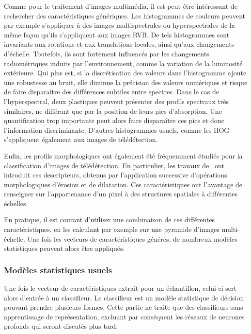 Comme pour le traitement d'images multimédia, il est peut être intéressant de rechercher des caractéristiques génériques. Les histogrammes de couleurs peuvent par exemple s'appliquer à des images multispectrales ou hyperspectrales de la même façon qu'ils s'appliquent aux images \gls{RVB}. De tels histogrammes sont invariants aux rotations et aux translations locales, ainsi qu'aux changements d'échelle. Toutefois, ils sont fortement influencés par les changements radiométriques induits par l'environnement, comme la variation de la luminosité extérieure. Qui plus est, si la discrétisation des valeurs dans l'histogramme ajoute une robustesse au bruit, elle diminue la précision des valeurs numériques et risque de faire disparaître des différences subtiles entre spectres. Dans le cas de l'hyperspectral, deux plastiques peuvent présenter des profils spectraux très similaires, ne différant que par la position de leurs pics d'absorption. Une quantification trop importante peut alors faire disparaître ces pics et donc l'information discriminante. D'autres histogrammes usuels, comme les \gls{HOG}~\cite{dalal_histograms_2005} s'appliquent également aux images de télédétection.

Enfin, les profils morphologiques ont également été fréquemment étudiés pour la classification d'images de télédétection. En particulier, les travaux de~\citet{benediktsson_classification_2003} ont introduit ces descripteurs, obtenus par l'application successive d'opérations morphologiques d'érosion et de dilatation. Ces caractéristiques ont l'avantage de renseigner sur l'appartenance d'un pixel à des structures spatiales à différentes échelles.

En pratique, il est courant d'utiliser une combinaison de ces différentes caractéristiques, en les calculant par exemple sur une pyramide d'images multi-échelle. Une fois les vecteurs de caractéristiques générés, de nombreux modèles statistiques peuvent alors être appliqués.

\subsubsection{Modèles statistiques usuels}

Une fois le vecteur de caractéristiques extrait pour un échantillon, celui-ci sert alors d'entrée à un classifieur. Le classifieur est un modèle statistique de décision pouvant prendre plusieurs formes. Cette partie ne traite que des classifieurs sans apprentissage de représentation, excluant par conséquent les réseaux de neurones profonds qui seront discutés plus tard.

